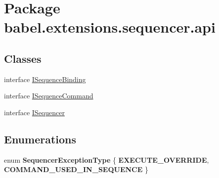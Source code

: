 \hypertarget{namespacebabel_1_1extensions_1_1sequencer_1_1api}{\section{Package babel.\-extensions.\-sequencer.\-api}
\label{namespacebabel_1_1extensions_1_1sequencer_1_1api}
}
\subsection*{Classes}
\begin{DoxyCompactItemize}
\item 
interface \hyperlink{interfacebabel_1_1extensions_1_1sequencer_1_1api_1_1_i_sequence_binding}{I\-Sequence\-Binding}
\item 
interface \hyperlink{interfacebabel_1_1extensions_1_1sequencer_1_1api_1_1_i_sequence_command}{I\-Sequence\-Command}
\item 
interface \hyperlink{interfacebabel_1_1extensions_1_1sequencer_1_1api_1_1_i_sequencer}{I\-Sequencer}
\end{DoxyCompactItemize}
\subsection*{Enumerations}
\begin{DoxyCompactItemize}
\item 
enum {\bfseries Sequencer\-Exception\-Type} \{ {\bfseries E\-X\-E\-C\-U\-T\-E\-\_\-\-O\-V\-E\-R\-R\-I\-D\-E}, 
{\bfseries C\-O\-M\-M\-A\-N\-D\-\_\-\-U\-S\-E\-D\-\_\-\-I\-N\-\_\-\-S\-E\-Q\-U\-E\-N\-C\-E}
 \}
\end{DoxyCompactItemize}
